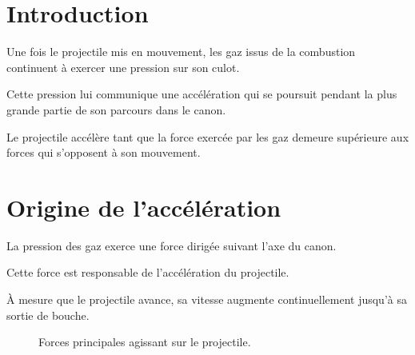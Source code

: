 
\section{Introduction}

Une fois le projectile mis en mouvement, les gaz issus de la combustion
continuent à exercer une pression sur son culot.

Cette pression lui communique une accélération qui se poursuit pendant la plus
grande partie de son parcours dans le canon.

\begin{aretenir}

Le projectile accélère tant que la force exercée par les gaz demeure
supérieure aux forces qui s'opposent à son mouvement.

\end{aretenir}

\section{Origine de l'accélération}

La pression des gaz exerce une force dirigée suivant l'axe du canon.

Cette force est responsable de l'accélération du projectile.

À mesure que le projectile avance, sa vitesse augmente continuellement jusqu'à
sa sortie de bouche.

\begin{figure}[htbp]
\centering


\caption{Forces principales agissant sur le projectile.}
\label{fig:forces_projectile}

\end{figure}

